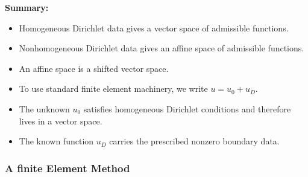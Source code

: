 \documentclass[../main.tex]{subfiles}
\begin{document}
\noindent\textbf{Summary:}
\begin{itemize}
    \item Homogeneous Dirichlet data gives a vector space of admissible functions.
    \item Nonhomogeneous Dirichlet data gives an affine space of admissible functions.
    \item An affine space is a shifted vector space.
    \item To use standard finite element machinery, we write $u=u_0+u_D$.
    \item The unknown $u_0$ satisfies homogeneous Dirichlet conditions and therefore lives in a vector space.
    \item The known function $u_D$ carries the prescribed nonzero boundary data.
\end{itemize}


\subsubsection{A finite Element Method}





\end{document}

